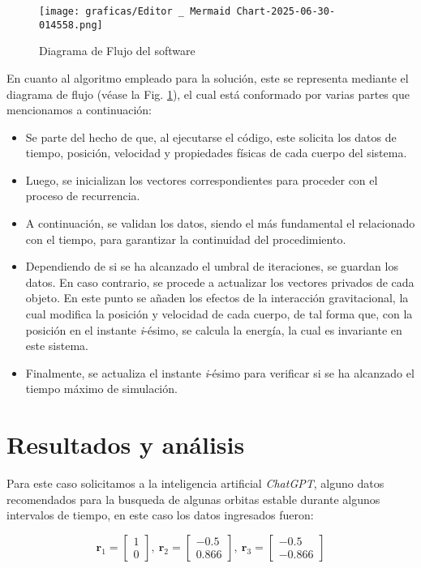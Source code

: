 \begin{figure}[H]
    \centering
    \texttt{[image: graficas/Editor \_ Mermaid Chart-2025-06-30-014558.png]}
    \caption{Diagrama de Flujo del software}
    \label{diagram flow}
\end{figure}

En cuanto al algoritmo empleado para la solución, este se representa mediante el diagrama de flujo (véase la Fig. \ref{diagram flow}), el cual está conformado por varias partes que mencionamos a continuación:
\begin{itemize}
    \item Se parte del hecho de que, al ejecutarse el código, este solicita los datos de tiempo, posición, velocidad y propiedades físicas de cada cuerpo del sistema.
    \item Luego, se inicializan los vectores correspondientes para proceder con el proceso de recurrencia.
    \item A continuación, se validan los datos, siendo el más fundamental el relacionado con el tiempo, para garantizar la continuidad del procedimiento.
    \item Dependiendo de si se ha alcanzado el umbral de iteraciones, se guardan los datos. En caso contrario, se procede a actualizar los vectores privados de cada objeto. En este punto se añaden los efectos de la interacción gravitacional, la cual modifica la posición y velocidad de cada cuerpo, de tal forma que, con la posición en el instante \textit{i}-ésimo, se calcula la energía, la cual es invariante en este sistema.
    \item Finalmente, se actualiza el instante \textit{i}-ésimo para verificar si se ha alcanzado el tiempo máximo de simulación.
\end{itemize}



\section{Resultados y análisis}
Para este caso solicitamos a la inteligencia artificial \textit{ChatGPT}, alguno datos recomendados para la busqueda de algunas orbitas estable durante algunos intervalos de tiempo, en este caso los datos ingresados fueron:

\begin{equation}
    \mathbf{r}_1=\begin{bmatrix}
        1 \\ 0
    \end{bmatrix}, \ \mathbf{r}_2=\begin{bmatrix}
        -0.5 \\ 0.866
    \end{bmatrix}, \ \mathbf{r}_3=\begin{bmatrix}
        -0.5 \\ - 0.866
    \end{bmatrix}
\end{equation}

